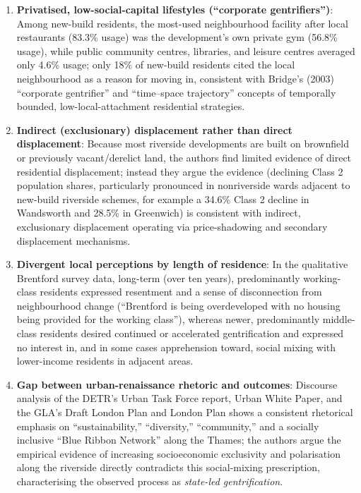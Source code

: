 \begin{enumerate}
  \item \textbf{Privatised, low-social-capital lifestyles (``corporate gentrifiers'')}: Among new-build residents, the most-used neighbourhood facility after local restaurants (83.3\% usage) was the development's own private gym (56.8\% usage), while public community centres, libraries, and leisure centres averaged only 4.6\% usage; only 18\% of new-build residents cited the local neighbourhood as a reason for moving in, consistent with Bridge's (2003) ``corporate gentrifier'' and ``time--space trajectory'' concepts of temporally bounded, low-local-attachment residential strategies.
  \item \textbf{Indirect (exclusionary) displacement rather than direct displacement}: Because most riverside developments are built on brownfield or previously vacant/derelict land, the authors find limited evidence of direct residential displacement; instead they argue the evidence (declining Class 2 population shares, particularly pronounced in nonriverside wards adjacent to new-build riverside schemes, for example a 34.6\% Class 2 decline in Wandsworth and 28.5\% in Greenwich) is consistent with indirect, exclusionary displacement operating via price-shadowing and secondary displacement mechanisms.
  \item \textbf{Divergent local perceptions by length of residence}: In the qualitative Brentford survey data, long-term (over ten years), predominantly working-class residents expressed resentment and a sense of disconnection from neighbourhood change (``Brentford is being overdeveloped with no housing being provided for the working class''), whereas newer, predominantly middle-class residents desired continued or accelerated gentrification and expressed no interest in, and in some cases apprehension toward, social mixing with lower-income residents in adjacent areas.
  \item \textbf{Gap between urban-renaissance rhetoric and outcomes}: Discourse analysis of the DETR's Urban Task Force report, Urban White Paper, and the GLA's Draft London Plan and London Plan shows a consistent rhetorical emphasis on ``sustainability,'' ``diversity,'' ``community,'' and a socially inclusive ``Blue Ribbon Network'' along the Thames; the authors argue the empirical evidence of increasing socioeconomic exclusivity and polarisation along the riverside directly contradicts this social-mixing prescription, characterising the observed process as \emph{state-led gentrification}.
\end{enumerate}

